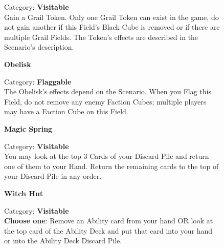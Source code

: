 \begin{figure}[H]
  \begin{minipage}[t]{0.47\textwidth}
    \vspace{0pt}
    \centering
    \phantom{j}\textbf{}\par
    \caption{\small Category: \textbf{Visitable}\\Gain a Grail Token.
    Only one Grail Token can exist in the game, do not gain another if this Field's Black Cube is removed or if there are multiple Grail Fields.
    The Token's effects are described in the Scenario's description.
    \phantom{\ldots\ldots\ldots}}
  \end{minipage}\hfill
  \begin{minipage}[t]{0.47\textwidth}
    \vspace{0pt}
    \centering
    \phantom{j}\textbf{Obelisk}\par
    \caption{\small Category: \textbf{Flaggable}\\
      The Obelisk's effects depend on the Scenario.
      When you Flag this Field, do not remove any enemy Faction Cubes; multiple players may have a Faction Cube on this Field.}
  \end{minipage}
\end{figure}

\begin{figure}[H]
  \begin{minipage}[t]{0.47\textwidth}
    \vspace{0pt}
    \centering
    \textbf{Magic Spring}\par
    \caption{\small Category: \textbf{Visitable}\\
      You may look at the top 3 Cards of your Discard Pile and return one of them to your Hand.
      Return the remaining cards to the top of your Discard Pile in any order.}
  \end{minipage}\hfill
  \begin{minipage}[t]{0.47\textwidth}
    \vspace{0pt}
    \centering
    \phantom{j}\textbf{Witch Hut}\par
    \caption{\small Category: \textbf{Visitable}\\
      \textbf{Choose one}: Remove an Ability card from your hand OR look at the top card of the Ability Deck and put that card into your hand or into the Ability Deck Discard Pile.}
  \end{minipage}
\end{figure}

